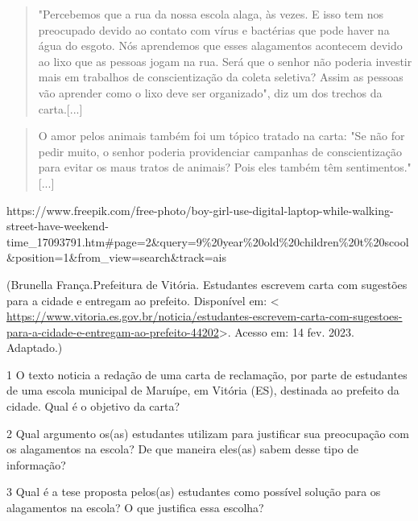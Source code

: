 {\begin{quote}
"Percebemos que a rua da nossa escola alaga, às vezes. E isso tem nos
preocupado devido ao contato com vírus e bactérias que pode haver na
água do esgoto. Nós aprendemos que esses alagamentos acontecem devido ao
lixo que as pessoas jogam na rua. Será que o senhor não poderia investir
mais em trabalhos de conscientização da coleta seletiva? Assim as
pessoas vão aprender como o lixo deve ser organizado", diz um dos
trechos da carta.{[}...{]}
\end{quote}

\begin{quote}
O amor pelos animais também foi um tópico tratado na carta: "Se não for
pedir muito, o senhor poderia providenciar campanhas de conscientização
para evitar os maus tratos de animais? Pois eles também têm
sentimentos." {[}...{]}
\end{quote}

https://www.freepik.com/free-photo/boy-girl-use-digital-laptop-while-walking-street-have-weekend-time\_17093791.htm\#page=2\&query=9\%20year\%20old\%20children\%20t\%20scool\&position=1\&from\_view=search\&track=ais

(Brunella França.Prefeitura de Vitória. Estudantes escrevem carta com
sugestões para a cidade e entregam ao prefeito. Disponível em:
\textless{}
\url{https://www.vitoria.es.gov.br/noticia/estudantes-escrevem-carta-com-sugestoes-para-a-cidade-e-entregam-ao-prefeito-44202}\textgreater.
Acesso em: 14 fev. 2023. Adaptado.)

\num{1} O texto noticia a redação de uma carta de reclamação, por parte
de estudantes de uma escola municipal de Maruípe, em Vitória (ES),
destinada ao prefeito da cidade. Qual é o objetivo da carta?


\num{2} Qual argumento os(as) estudantes utilizam para justificar sua
preocupação com os alagamentos na escola? De que maneira eles(as) sabem
desse tipo de informação?


\num{3} Qual é a tese proposta pelos(as) estudantes como possível
solução para os alagamentos na escola? O que justifica essa escolha?

}
